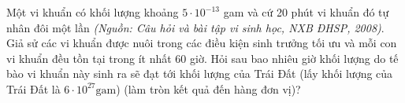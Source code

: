 \begin{bt}%
 
	Một vi khuẩn có khối lượng khoảng $5 \cdot 10^{-13}$ gam và cứ 20 phút vi khuẩn đó tự nhân đôi một lần \textit{(Nguồn: Câu hỏi và bài tập vi sinh học, NXB ĐHSP, 2008)}. Giả sử các vi khuẩn được nuôi trong các điều kiện sinh trưởng tối ưu và mỗi con vi khuẩn đều tồn tại trong ít nhất 60 giờ. Hỏi sau bao nhiêu giờ khối lượng do tế bào vi khuẩn này sinh ra sẽ đạt tới khối lượng của Trái Đất (lấy khối lượng của Trái Đất là $6 \cdot 10^{27} \mathrm{gam}$) (làm tròn kết quả đến hàng đơn vị)?
\end{bt}

